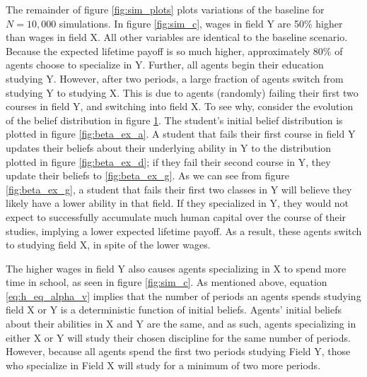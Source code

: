 \documentclass[10 pt]{article}
\newcommand{\toedit}[1]{{\color{gray}#1}}
\newcommand{\toedit}[1]{#1}
\begin{document}
\begin{figure}[t!]
\centering

\label{fig:beta_change}
\end{figure}

The remainder of figure \ref{fig:sim_plots} plots variations of the baseline for $N = 10,000$ simulations.
In figure \ref{fig:sim_c}, wages in field Y are 50\% higher than wages in field X. 
All other variables are identical to the baseline scenario. 
Because the expected lifetime payoff is so much higher, approximately 80\% of agents choose to specialize in Y.
Further, all agents begin their education studying Y.
However, after two periods, a large fraction of agents switch from studying Y to studying X. 
\toedit{This is due to agents (randomly) failing their first two courses in field Y, and switching into field X.}
To see why, consider the evolution of the belief distribution in figure \ref{fig:beta_change}. 
The student's initial belief distribution is plotted in figure \ref{fig:beta_ex_a}.
A student that fails their first course in field Y updates their beliefs about their underlying ability in Y to the distribution plotted in figure \ref{fig:beta_ex_d}; if they fail their second course in Y, they update their beliefs to \ref{fig:beta_ex_g}.
As we can see from figure \ref{fig:beta_ex_g}, a student that fails their first two classes in Y will believe they likely have a lower ability in that field.
If they specialized in Y, they would not expect to successfully accumulate much human capital over the course of their studies, implying a lower expected lifetime payoff.
As a result, these agents switch to studying field X, in spite of the lower wages. 


The higher wages in field Y also causes agents specializing in X to spend more time in school, as seen in figure \ref{fig:sim_c}.
As mentioned above, equation \eqref{eq:h_eq_alpha_v} implies that the number of periods an agents spends studying field X or Y is a deterministic function of initial beliefs. 
Agents' initial beliefs about their abilities in X and Y are the same, and as such, agents specializing in either X or Y will study their chosen discipline for the same number of periods. 
However, because all agents spend the first two periods studying Field Y, those who specialize in Field X will study for a minimum of two more periods.
\end{document}
